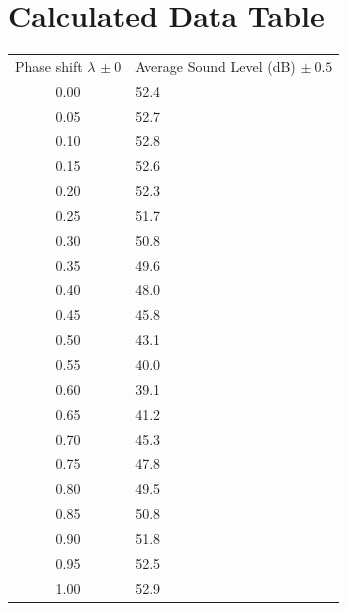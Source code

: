 \documentclass[index]{subfiles}
\begin{document}
\section{Calculated Data Table}

\begin{table}[H]
    \centering
    \begin{tabularx}{0.6\textwidth}{c|X}
        Phase shift \(\lambda\) \(\pm\ 0\) & Average Sound Level (dB) \(\pm\ 0.5\) \\
        0.00                               & 52.4                                  \\
        0.05                               & 52.7                                  \\
        0.10                               & 52.8                                  \\
        0.15                               & 52.6                                  \\
        0.20                               & 52.3                                  \\
        0.25                               & 51.7                                  \\
        0.30                               & 50.8                                  \\
        0.35                               & 49.6                                  \\
        0.40                               & 48.0                                  \\
        0.45                               & 45.8                                  \\
        0.50                               & 43.1                                  \\
        0.55                               & 40.0                                  \\
        0.60                               & 39.1                                  \\
        0.65                               & 41.2                                  \\
        0.70                               & 45.3                                  \\
        0.75                               & 47.8                                  \\
        0.80                               & 49.5                                  \\
        0.85                               & 50.8                                  \\
        0.90                               & 51.8                                  \\
        0.95                               & 52.5                                  \\
        1.00                               & 52.9                                  \\
    \end{tabularx}
\end{table}
\end{document}
